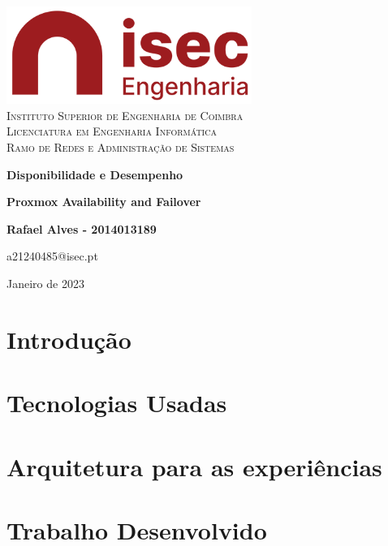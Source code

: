 \documentclass[a4paper,12pt]{report}
\def\data{Janeiro de 2023}
\begin{document}
    \begin{titlepage}
    	\begin{center}
    		\includegraphics[width=0.6\textwidth]{logo_isec.png}
    		\large\textsc{
				   \\Instituto Superior de Engenharia de Coimbra\\
				   Licenciatura em Engenharia Informática\\
				   Ramo de Redes e Administração de Sistemas
	            }
    		
    		\vspace{3cm}
    		\huge
    		\textbf{Disponibilidade e Desempenho}
    		\vspace{1.5cm}
    		
    		\huge
    		\textbf{Proxmox Availability and Failover}
    		
    		\vspace{2cm}
    		\textbf{Rafael Alves - 2014013189}
    		
    		\vfill
    		a21240485@isec.pt
    		
    		\vspace*{\fill}
    		\normalsize
            \data
    	\end{center}
    \end{titlepage}


\tableofcontents
\listoftables
\listoffigures

%



\clearpage
{}

\chapter{Introdução}


\chapter{Tecnologias Usadas}


\chapter{Arquitetura para as experiências}


\chapter{Trabalho Desenvolvido}

\end{document}
